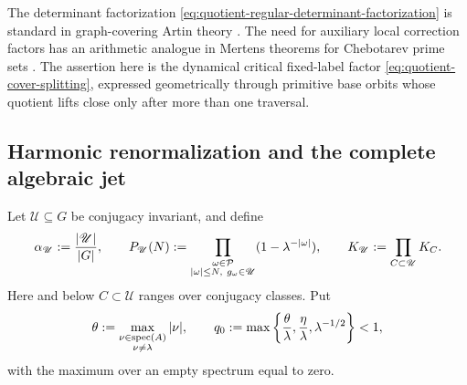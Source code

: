 The determinant factorization
\eqref{eq:quotient-regular-determinant-factorization} is standard in
graph-covering Artin theory \cite{StarkTerras1996FiniteGraphsCoverings}.  The
need for auxiliary local correction factors has an arithmetic analogue in
Mertens theorems for Chebotarev prime sets
\cite{ArangoPinerosKeliherKeyes2022ChebotarevMertens}.  The assertion here is
the dynamical critical fixed-label factor
\eqref{eq:quotient-cover-splitting}, expressed geometrically through primitive
base orbits whose quotient lifts close only after more than one traversal.

\subsection{Harmonic renormalization and the complete algebraic jet}

Let \(\mathscr U\subseteq G\) be conjugacy invariant, and define
\begin{equation}\label{eq:union-class-product}
 \alpha_{\mathscr U}:=\frac{|\mathscr U|}{|G|},\qquad
 P_{\mathscr U}(N):=
 \prod_{\substack{\omega\in\mathcal P\\|\omega|\le N,\ g_\omega\in\mathscr U}}
   (1-\lambda^{-|\omega|}),\qquad
 K_{\mathscr U}:=\prod_{C\subset\mathscr U}K_C.
\end{equation}
Here and below \(C\subset\mathscr U\) ranges over conjugacy classes.  Put
\begin{equation}\label{eq:refined-exponential-rate}
 \theta:=\max_{\substack{\nu\in\operatorname{spec}(A)\\\nu\ne\lambda}}|\nu|,
 \qquad
 q_0:=\max\left\{\frac{\theta}{\lambda},
                   \frac{\eta}{\lambda},\lambda^{-1/2}\right\}<1,
\end{equation}
with the maximum over an empty spectrum equal to zero.

